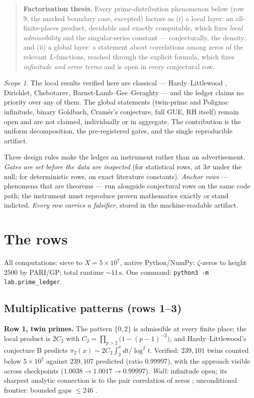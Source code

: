 \documentclass[11pt]{article}
\theoremstyle{remark}
\newtheorem*{scope}{Scope}
\begin{document}
\begin{quote}
\textbf{Factorisation thesis.} Every prime-distribution phenomenon below
(row 9, the marked boundary case, excepted) factors as (i) a local layer: an
all-finite-places product, decidable and exactly computable, which fixes
\emph{local admissibility} and the singular-series constant --- conjecturally,
the density; and (ii) a global layer: a statement about correlations
among zeros of the relevant $L$-functions, reached through the explicit
formula, which fixes \emph{infinitude and error terms} and is open in every
conjectural row.
\end{quote}

\begin{scope}
The local results verified here are classical --- Hardy--Littlewood
\cite{HL1923}, Dirichlet, Chebotarev, Barnet-Lamb--Gee--Geraghty
\cite{BLGHT} --- and the ledger claims no priority over any of them. The
global statements (twin-prime and Polignac infinitude, binary Goldbach,
Cram\'er's conjecture, full GUE, RH itself) remain open and are not claimed,
individually or in aggregate. The contribution is the uniform decomposition,
the pre-registered gates, and the single reproducible artifact.
\end{scope}

Three design rules make the ledger an instrument rather than an
advertisement. \emph{Gates are set before the data are inspected} (for
statistical rows, at $3\sigma$ under the null; for deterministic rows, on
exact literature constants). \emph{Anchor rows} --- phenomena that are
theorems --- run alongside conjectural rows on the same code path; the
instrument must reproduce proven mathematics exactly or stand indicted.
\emph{Every row carries a falsifier}, stored in the machine-readable artifact.

\section{The rows}

All computations: sieve to $X=5\times10^7$, native Python/NumPy;
$\zeta$-zeros to height $2500$ by PARI/GP; total runtime $\sim$11\,s.
One command: \texttt{python3 -m lab.prime\_ledger}.

\subsection{Multiplicative patterns (rows 1--3)}

\textbf{Row 1, twin primes.} The pattern $\{0,2\}$ is admissible at every
finite place; the local product is $2C_2$ with
$C_2=\prod_{p>2}\bigl(1-(p-1)^{-2}\bigr)$, and Hardy--Littlewood's
conjecture B predicts $\pi_2(x)\sim 2C_2\int_2^x dt/\log^2 t$. Verified:
$239{,}101$ twins counted below $5\times10^7$ against $239{,}107$ predicted
(ratio $0.99997$), with the approach visible across checkpoints
($1.0038 \to 1.0017 \to 0.99997$). \emph{Wall:} infinitude open; its
sharpest analytic connection is to the pair correlation of zeros
\cite{Goldston}; unconditional frontier: bounded gaps $\le 246$
\cite{Maynard,Polymath8b}.
\end{document}
